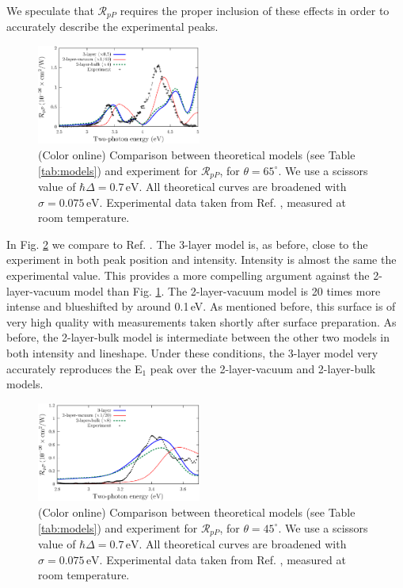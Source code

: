 \documentclass[prb,superscriptaddress,showpacs,twocolumn,letterpaper]{revtex4}
\begin{document}
We speculate that $\mathcal{R}_{pP}$ requires the
proper inclusion of these effects in order to accurately describe the
experimental peaks.

\begin{figure}[b]
\centering 
\includegraphics[width=0.48\textwidth]{plots/fig7}
\caption{(Color online) Comparison between theoretical models (see Table
\ref{tab:models}) and experiment for $\mathcal{R}_{pP}$, for
$\theta=65^{\circ}$. We use a scissors value of $\hbar\Delta = 0.7\,\text{eV}$.
All theoretical curves are broadened with $\sigma=0.075\,\text{eV}$.
Experimental data taken from Ref. , measured at room
temperature.
\label{fig:RpP}}
\end{figure}

In Fig. \ref{fig:mitchellRpP} we compare to Ref. . The
3-layer model is, as before, close to the experiment in both peak position and
intensity. Intensity is almost the same the experimental value. This provides a
more compelling argument against the 2-layer-vacuum model than Fig.
\ref{fig:RpP}. The 2-layer-vacuum model is 20 times more intense and blueshifted
by around 0.1\,eV. As mentioned before, this surface is of very high quality
with measurements taken shortly after surface preparation. As before, the
2-layer-bulk model is intermediate between the other two models in both
intensity and lineshape. Under these conditions, the 3-layer model very
accurately reproduces the E$_{1}$ peak over the 2-layer-vacuum and 2-layer-bulk
models.

\begin{figure}[t]
\centering
\includegraphics[width=0.48\textwidth]{plots/fig8}
\caption{(Color online) Comparison between theoretical models (see Table
\ref{tab:models}) and experiment for $\mathcal{R}_{pP}$, for
$\theta=45^{\circ}$. We use a scissors value of $\hbar\Delta = 0.7\,\text{eV}$.
All theoretical curves are broadened with $\sigma=0.075\,\text{eV}$.
Experimental data taken from Ref. , measured at room
temperature.
\label{fig:mitchellRpP}}
\end{figure}
\end{document}
